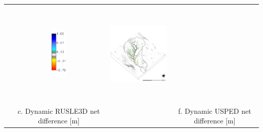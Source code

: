 \documentclass{standalone}
\begin{document}
\begin{tabular}{m{} m{} m{} m{}}
& \multicolumn{1}{c}{\includegraphics[height=25mm]{../../images/usped_3d/legend_difference.png}}
& \multicolumn{1}{c}{\includegraphics[height=50mm]{../../images/usped_3d/difference_carto.png}}\\
\multicolumn{1}{c}{} 
& \multicolumn{1}{c}{c. Dynamic RUSLE3D net difference [m]}
& \multicolumn{1}{c}{} 
& \multicolumn{1}{c}{f. Dynamic USPED net difference [m]}\\

%
\end{tabular}

\end{document}
